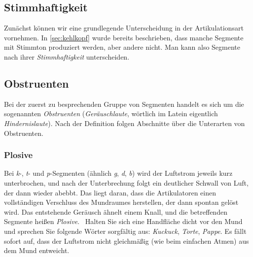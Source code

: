 \subsection{Stimmhaftigkeit}

\label{sec:stimmhaftigkeit}

Zunächst können wir eine grundlegende Unterscheidung in der Artikulationsart vornehmen.
In \ref{sec:kehlkopf} wurde bereits beschrieben, dass manche Segmente mit Stimmton produziert werden, aber andere nicht.
Man kann also Segmente nach ihrer \textit{Stimmhaftigkeit} unterscheiden.


\subsection{Obstruenten}

Bei der zuerst zu besprechenden Gruppe von Segmenten handelt es sich um die sogenannten \textit{Obstruenten} (\textit{Geräuschlaute}, wörtlich im Latein eigentlich \textit{Hindernislaute}).
Nach der Definition folgen Abschnitte über die Unterarten von Obstruenten.


\subsubsection{Plosive}

Bei \textit{k}-, \textit{t}- und \textit{p}-Segmenten (ähnlich \textit{g}, \textit{d}, \textit{b}) wird der Luftstrom jeweils kurz unterbrochen, und nach der Unterbrechung folgt ein deutlicher Schwall von Luft, der dann wieder abebbt.
Das liegt daran, dass die Artikulatoren einen vollständigen Verschluss des Mundraumes herstellen, der dann spontan gelöst wird.
Das entstehende Geräusch ähnelt einem Knall, und die betreffenden Segmente heißen \textit{Plosive}.
\TuBegin~Halten Sie sich eine Handfläche dicht vor den Mund und sprechen Sie folgende Wörter sorgfältig aus: \textit{Kuckuck}, \textit{Torte}, \textit{Pappe}.
Es fällt sofort auf, dass der Luftstrom nicht gleichmäßig (wie beim einfachen Atmen) aus dem Mund entweicht.


